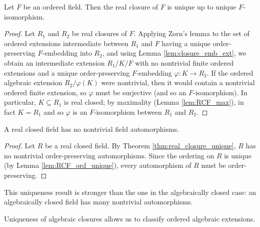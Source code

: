 \begin{theorem}
  \label{thm:real_closure_unique}
  Let $F$ be an ordered field. Then the real closure of $F$ is unique up to unique $F$-isomorphism.
\end{theorem}
\begin{proof}
  Let $R_1$ and $R_2$ be real closures of $F$. Applying Zorn's lemma to the set of ordered extensions intermediate between $R_1$ and $F$ having a unique order-preserving $F$-embedding into $R_2$, and using Lemma \ref{lem:closure_emb_ext}, we obtain an intermediate extension $R_1/K/F$ with no nontrivial finite ordered extensions and a unique order-preserving $F$-embedding $\varphi:K\to R_2$. If the ordered algebraic extension $R_2/\varphi(K)$ were nontrivial, then it would contain a nontrivial ordered finite extension, so $\varphi$ must be surjective (and so an $F$-isomorphism). In particular, $K\subseteq R_1$ is real closed; by maximality (Lemma \ref{lem:RCF_max}), in fact $K=R_1$ and so $\varphi$ is an $F$-isomorphism between $R_1$ and $R_2$.
\end{proof}

\begin{corollary}
  \label{cor:RCF_no_auto}
  A real closed field has no nontrivial field automorphisms.
\end{corollary}
\begin{proof}
  Let $R$ be a real closed field. By Theorem \ref{thm:real_closure_unique}, $R$ has no nontrivial order-preserving automorphisms. Since the ordering on $R$ is unique (by Lemma \ref{lem:RCF_ord_unique}), every automorphism of $R$ must be order-preserving.
\end{proof}

This uniqueness result is stronger than the one in the algebraically closed case: an algebraically closed field has many nontrivial automorphisms.

Uniqueness of algebraic closures allows us to classify ordered algebraic extensions.

